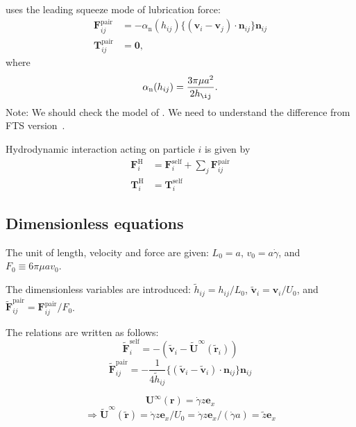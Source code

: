 \documentclass[12pt]{article}
\begin{document}
\citet{Melrose_2004a} uses 
the leading squeeze mode of lubrication force:
\begin{align}
 \bm{F}_{ij}^{\mathrm{pair}}
&=
- \alpha_{\mathrm{n}}(h_{ij})
\bigl\{
(\bm{v}_i - \bm{v}_j)
\cdot \bm{n}_{ij}
\bigr\}
\bm{n}_{ij} \\
 \bm{T}_{ij}^{\mathrm{pair}}
&=
\bm{0},
\end{align}
where
\begin{equation}
 \alpha_{\mathrm{n}}(h_{ij}) = 
\frac{3 \pi \mu a^2}{2 h_{\ij}}.
\end{equation}
Note: We should check the model of \citet{Ball_1997,Melrose_2004a}.
%
We need to understand the difference from FTS version~\citet{Jeffrey_1992}.


Hydrodynamic interaction acting on particle $i$
is given by
\begin{align}
\bm{F}_i^{\mathrm{H}}
&=
\bm{F}_i^{\mathrm{self}}
+
\sum_j
\bm{F}_{ij}^{\mathrm{pair}} \\
\bm{T}_i^{\mathrm{H}}
&=
\bm{T}_i^{\mathrm{self}}
\end{align}


\subsection*{Dimensionless equations}

The unit of length, velocity and force 
are given:
$L_0 = a$,  $v_0 = a \dot{\gamma}$, and $F_0 \equiv 6 \pi \mu a v_0$.

The dimensionless variables are introduced:
$\tilde{h}_{ij} = h_{ij} / L_0$,
$\tilde{\bm{v}}_i = \bm{v}_i / U_0$,
and $\tilde{\bm{F}}_{ij}^{\mathrm{pair}} = \bm{F}_{ij}^{\mathrm{pair}} / F_0$.

The relations are written as follows:
\begin{equation}
 \tilde{\bm{F}}_i^{\mathrm{self}} = 
-( \tilde{\bm{v}}_i - 
\tilde{\bm{U}}^{\infty} 
(\tilde{\bm{r}}_i) )
\end{equation}
\begin{equation}
 \tilde{\bm{F}}_{ij}^{\mathrm{pair}}
= 
- \frac{1}{4 \tilde{h}_{ij}}
\bigl\{
(\tilde{\bm{v}}_i-
\tilde{\bm{v}}_i)\cdot
\bm{n}_{ij}
\bigr\}\bm{n}_{ij}
\end{equation}

\begin{equation}
 \bm{U}^{\infty}(\bm{r})
 = 
 \dot{\gamma} z \bm{e}_{x}
\end{equation}
\begin{equation}
\Longrightarrow
  \tilde{\bm{U}}^{\infty}(\tilde{\bm{r}})
 = 
 \dot{\gamma} z \bm{e}_{x} / U_0
=  \dot{\gamma} z \bm{e}_{x} / (\dot{\gamma} a)
= \tilde{z} \bm{e}_{x} 
\end{equation}
\end{document}
